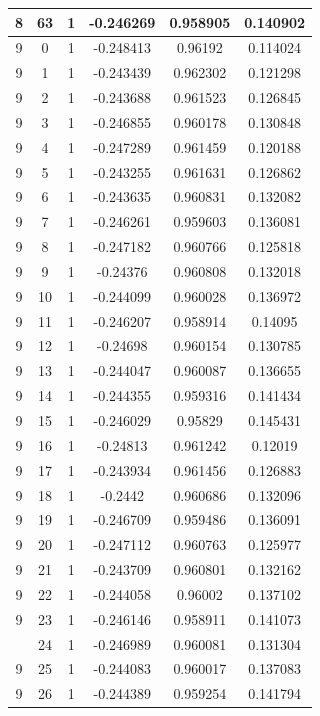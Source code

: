 \documentclass[12pt,a4paper]{article}
\numberwithin{equation}{section}
\numberwithin{figure}{section}
\numberwithin{table}{section}
\begin{document}
\begin{longtable}{|c|c|c|c|c|c|}
8 & 63 & 1 & -0.246269 & 0.958905 & 0.140902 \\ \hline
9 & 0 & 1 & -0.248413 & 0.96192 & 0.114024 \\ \hline
9 & 1 & 1 & -0.243439 & 0.962302 & 0.121298 \\ \hline
9 & 2 & 1 & -0.243688 & 0.961523 & 0.126845 \\ \hline
9 & 3 & 1 & -0.246855 & 0.960178 & 0.130848 \\ \hline
9 & 4 & 1 & -0.247289 & 0.961459 & 0.120188 \\ \hline
9 & 5 & 1 & -0.243255 & 0.961631 & 0.126862 \\ \hline
9 & 6 & 1 & -0.243635 & 0.960831 & 0.132082 \\ \hline
9 & 7 & 1 & -0.246261 & 0.959603 & 0.136081 \\ \hline
9 & 8 & 1 & -0.247182 & 0.960766 & 0.125818 \\ \hline
9 & 9 & 1 & -0.24376 & 0.960808 & 0.132018 \\ \hline
9 & 10 & 1 & -0.244099 & 0.960028 & 0.136972 \\ \hline
9 & 11 & 1 & -0.246207 & 0.958914 & 0.14095 \\ \hline
9 & 12 & 1 & -0.24698 & 0.960154 & 0.130785 \\ \hline
9 & 13 & 1 & -0.244047 & 0.960087 & 0.136655 \\ \hline
9 & 14 & 1 & -0.244355 & 0.959316 & 0.141434 \\ \hline
9 & 15 & 1 & -0.246029 & 0.95829 & 0.145431 \\ \hline
9 & 16 & 1 & -0.24813 & 0.961242 & 0.12019 \\ \hline
9 & 17 & 1 & -0.243934 & 0.961456 & 0.126883 \\ \hline
9 & 18 & 1 & -0.2442 & 0.960686 & 0.132096 \\ \hline
9 & 19 & 1 & -0.246709 & 0.959486 & 0.136091 \\ \hline
9 & 20 & 1 & -0.247112 & 0.960763 & 0.125977 \\ \hline
9 & 21 & 1 & -0.243709 & 0.960801 & 0.132162 \\ \hline
9 & 22 & 1 & -0.244058 & 0.96002 & 0.137102 \\ \hline
9 & 23 & 1 & -0.246146 & 0.958911 & 0.141073 \\ \hline
\pagebreak
9 & 24 & 1 & -0.246989 & 0.960081 & 0.131304 \\ \hline
9 & 25 & 1 & -0.244083 & 0.960017 & 0.137083 \\ \hline
9 & 26 & 1 & -0.244389 & 0.959254 & 0.141794 \\ \hline

\end{longtable}
\end{document}
